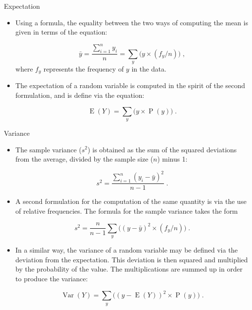 \documentclass[10pt]{beamer}\usepackage[]{graphicx}\usepackage[]{color}
\newcommand{\Var}{\operatorname{Var}}
\newcommand{\Expec}{\operatorname{E}}
\newcommand{\Prob}{\operatorname{P}}
\begin{document}
\begin{frame}[fragile]{Expectation}
	\small
	\begin{itemize}		
	
		\item Using a formula, the equality between the two ways of computing the mean is
		given in terms of the equation:
		
		$$\bar y = \frac{\sum_{i=1}^n y_i}{n} = \sum_y \big(y \times (f_y/n)\big)\;,$$
		where $f_y$ represents the frequency of $y$ in the data. 
		
		\item The expectation of a random variable is computed in the spirit of the
		second formulation, and is define via the equation:
		
		$$\Expec(Y) = \sum_y \big(y \times \Prob(y)\big)\;.$$
		
		
	\end{itemize}
	
\end{frame}



\begin{frame}[fragile]{Variance}
	\small
	\begin{itemize}		
		
		\item The sample variance ($s^2$) is obtained as the sum of the squared
		deviations from the average, divided by the sample size ($n$) minus 1:
		
		$$s^2 = \frac{\sum_{i=1}^n (y_i - \bar y)^2}{n-1}\;.$$ 
		
		\item  A second	formulation for the computation of the same quantity is via the use of
		relative frequencies. The formula for the sample variance takes the form
		
		$$s^2 = \frac{n}{n-1}\sum_y \big((y - \bar y)^2\times (f_y/n)\big)\;.$$
		
		
		\item In a similar way, the variance of a random variable may be defined via
		the deviation from the expectation. This deviation is
		then squared and multiplied by the probability of the value. The
		multiplications are summed up in order to produce the variance:
		
		$$\Var(Y) = \sum_y\big( (y-\Expec(Y))^2 \times \Prob(y)\big)\;.$$
		
	\end{itemize}
	
\end{frame}
\end{document}
